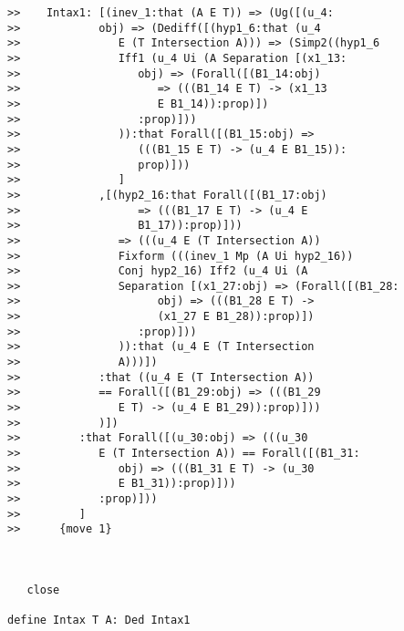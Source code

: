 \documentclass[12pt]{article}
\begin{document}
\begin{verbatim}
>>    Intax1: [(inev_1:that (A E T)) => (Ug([(u_4:
>>            obj) => (Dediff([(hyp1_6:that (u_4
>>               E (T Intersection A))) => (Simp2((hyp1_6
>>               Iff1 (u_4 Ui (A Separation [(x1_13:
>>                  obj) => (Forall([(B1_14:obj)
>>                     => (((B1_14 E T) -> (x1_13
>>                     E B1_14)):prop)])
>>                  :prop)]))
>>               )):that Forall([(B1_15:obj) =>
>>                  (((B1_15 E T) -> (u_4 E B1_15)):
>>                  prop)]))
>>               ]
>>            ,[(hyp2_16:that Forall([(B1_17:obj)
>>                  => (((B1_17 E T) -> (u_4 E
>>                  B1_17)):prop)]))
>>               => (((u_4 E (T Intersection A))
>>               Fixform (((inev_1 Mp (A Ui hyp2_16))
>>               Conj hyp2_16) Iff2 (u_4 Ui (A
>>               Separation [(x1_27:obj) => (Forall([(B1_28:
>>                     obj) => (((B1_28 E T) ->
>>                     (x1_27 E B1_28)):prop)])
>>                  :prop)]))
>>               )):that (u_4 E (T Intersection
>>               A)))])
>>            :that ((u_4 E (T Intersection A))
>>            == Forall([(B1_29:obj) => (((B1_29
>>               E T) -> (u_4 E B1_29)):prop)]))
>>            )])
>>         :that Forall([(u_30:obj) => (((u_30
>>            E (T Intersection A)) == Forall([(B1_31:
>>               obj) => (((B1_31 E T) -> (u_30
>>               E B1_31)):prop)]))
>>            :prop)]))
>>         ]
>>      {move 1}



   close

define Intax T A: Ded Intax1


\end{verbatim}
\end{document}
